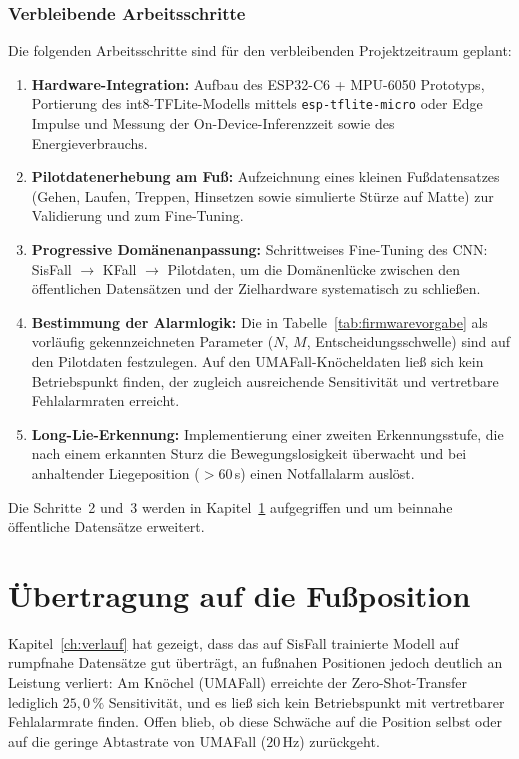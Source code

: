 \documentclass[11pt,a4paper,oneside]{report}
\begin{document}
\subsection{Verbleibende Arbeitsschritte}

Die folgenden Arbeitsschritte sind für den verbleibenden
Projektzeitraum geplant:

\begin{enumerate}
\item \textbf{Hardware-Integration:} Aufbau des ESP32-C6 + MPU-6050
      Prototyps, Portierung des int8-TFLite-Modells mittels
      \texttt{esp-tflite-micro} oder Edge Impulse und Messung der
      On-Device-Inferenzzeit sowie des Energieverbrauchs.
\item \textbf{Pilotdatenerhebung am Fuß:} Aufzeichnung eines kleinen
      Fußdatensatzes (Gehen, Laufen, Treppen, Hinsetzen sowie
      simulierte Stürze auf Matte) zur Validierung und zum
      Fine-Tuning.
\item \textbf{Progressive Domänenanpassung:} Schrittweises
      Fine-Tuning des CNN: SisFall $\rightarrow$ KFall $\rightarrow$
      Pilotdaten, um die Domänenlücke zwischen den öffentlichen
      Datensätzen und der Zielhardware systematisch zu schließen.
\item \textbf{Bestimmung der Alarmlogik:} Die in
      Tabelle~\ref{tab:firmwarevorgabe} als vorläufig
      gekennzeichneten Parameter ($N$, $M$, Entscheidungsschwelle)
      sind auf den Pilotdaten festzulegen. Auf den
      UMAFall-Knöcheldaten ließ sich kein Betriebspunkt finden, der
      zugleich ausreichende Sensitivität und vertretbare
      Fehlalarmraten erreicht.
\item \textbf{Long-Lie-Erkennung:} Implementierung einer zweiten
      Erkennungsstufe, die nach einem erkannten Sturz die
      Bewegungslosigkeit überwacht und bei anhaltender Liegeposition
      ($> 60$\,s) einen Notfallalarm auslöst.
\end{enumerate}

Die Schritte~2 und~3 werden in Kapitel~\ref{ch:fuss} aufgegriffen und
um beinnahe öffentliche Datensätze erweitert.

\chapter{Übertragung auf die Fußposition}
\label{ch:fuss}

Kapitel~\ref{ch:verlauf} hat gezeigt, dass das auf SisFall trainierte
Modell auf rumpfnahe Datensätze gut überträgt, an fußnahen Positionen
jedoch deutlich an Leistung verliert: Am Knöchel (UMAFall) erreichte
der Zero-Shot-Transfer lediglich $25{,}0\,\%$ Sensitivität, und es
ließ sich kein Betriebspunkt mit vertretbarer Fehlalarmrate finden.
Offen blieb, ob diese Schwäche auf die Position selbst oder auf die
geringe Abtastrate von UMAFall ($20$\,Hz) zurückgeht.
\end{document}

